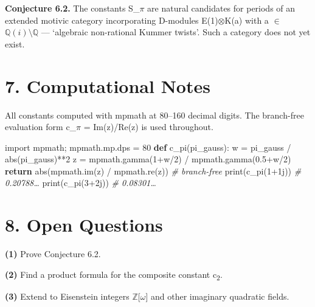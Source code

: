\documentclass[11pt]{article}
\newenvironment{Shaded}{\begin{snugshade}}{\end{snugshade}}
\providecommand{\BuiltInTok}[1]{#1}
\providecommand{\CommentTok}[1]{\textcolor[rgb]{0.38,0.63,0.69}{\textit{#1}}}
\providecommand{\ControlFlowTok}[1]{\textcolor[rgb]{0.00,0.44,0.13}{\textbf{#1}}}
\providecommand{\DecValTok}[1]{\textcolor[rgb]{0.25,0.63,0.44}{#1}}
\providecommand{\FloatTok}[1]{\textcolor[rgb]{0.25,0.63,0.44}{#1}}
\providecommand{\ImportTok}[1]{#1}
\providecommand{\KeywordTok}[1]{\textcolor[rgb]{0.00,0.44,0.13}{\textbf{#1}}}
\providecommand{\NormalTok}[1]{#1}
\providecommand{\OperatorTok}[1]{\textcolor[rgb]{0.40,0.40,0.40}{#1}}
\providecommand{\OtherTok}[1]{\textcolor[rgb]{0.00,0.44,0.13}{#1}}
\begin{document}
\textbf{Conjecture 6.2.} The constants S\_\(\pi\) are natural candidates
for periods of an extended motivic category incorporating D-modules
E(1)\(\otimes\)K(a) with a \(\in\) \(\mathbb{Q}(i)\setminus \mathbb{Q}\)
--- `algebraic non-rational Kummer twists'. Such a category does not yet
exist.

\hypertarget{computational-notes}{%
\section{7. Computational Notes}\label{computational-notes}}

All constants computed with mpmath at 80--160 decimal digits. The
branch-free evaluation form c\_\(\pi\) = \textbar Im(z)/Re(z)\textbar{}
is used throughout.

\begin{Shaded}
\begin{Highlighting}[]
\ImportTok{import}\NormalTok{ mpmath}\OperatorTok{;}\NormalTok{ mpmath.mp.dps }\OperatorTok{=} \DecValTok{80}
\KeywordTok{def}\NormalTok{ c\_pi(pi\_gauss):}
\NormalTok{    w }\OperatorTok{=}\NormalTok{ pi\_gauss }\OperatorTok{/} \BuiltInTok{abs}\NormalTok{(pi\_gauss)}\OperatorTok{**}\DecValTok{2}
\NormalTok{    z }\OperatorTok{=}\NormalTok{ mpmath.gamma(}\DecValTok{1}\OperatorTok{+}\NormalTok{w}\OperatorTok{/}\DecValTok{2}\NormalTok{) }\OperatorTok{/}\NormalTok{ mpmath.gamma(}\FloatTok{0.5}\OperatorTok{+}\NormalTok{w}\OperatorTok{/}\DecValTok{2}\NormalTok{)}
    \ControlFlowTok{return} \BuiltInTok{abs}\NormalTok{(mpmath.im(z) }\OperatorTok{/}\NormalTok{ mpmath.re(z)) }\CommentTok{\# branch{-}free}
\BuiltInTok{print}\NormalTok{(c\_pi(}\DecValTok{1}\OperatorTok{+}\OtherTok{1j}\NormalTok{))  }\CommentTok{\# 0.20788…}
\BuiltInTok{print}\NormalTok{(c\_pi(}\DecValTok{3}\OperatorTok{+}\OtherTok{2j}\NormalTok{))  }\CommentTok{\# 0.08301…}
\end{Highlighting}
\end{Shaded}

\hypertarget{open-questions}{%
\section{8. Open Questions}\label{open-questions}}

\textbf{(1)} Prove Conjecture 6.2.

\textbf{(2)} Find a product formula for the composite constant
c\textsubscript{2}.

\textbf{(3)} Extend to Eisenstein integers
\(\mathbb{Z}\){[}\(\omega\){]} and other imaginary quadratic fields.
\end{document}
